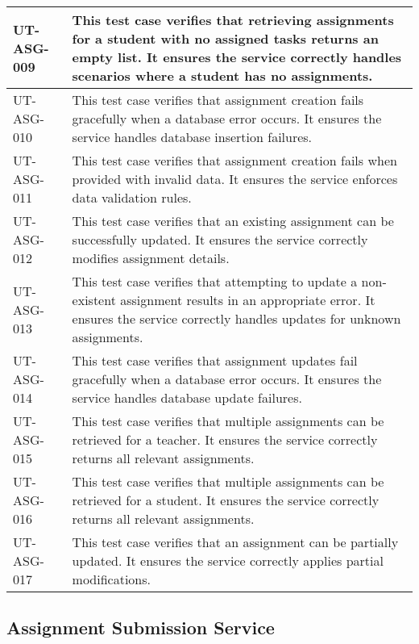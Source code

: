 \begin{longtable}{|p{}|p{}|}
\hline
UT-ASG-009 & This test case verifies that retrieving assignments for a student with no assigned tasks returns an empty list. It ensures the service correctly handles scenarios where a student has no assignments. \\
\hline
UT-ASG-010 & This test case verifies that assignment creation fails gracefully when a database error occurs. It ensures the service handles database insertion failures. \\
\hline
UT-ASG-011 & This test case verifies that assignment creation fails when provided with invalid data. It ensures the service enforces data validation rules. \\
\hline
UT-ASG-012 & This test case verifies that an existing assignment can be successfully updated. It ensures the service correctly modifies assignment details. \\
\hline
UT-ASG-013 & This test case verifies that attempting to update a non-existent assignment results in an appropriate error. It ensures the service correctly handles updates for unknown assignments. \\
\hline
UT-ASG-014 & This test case verifies that assignment updates fail gracefully when a database error occurs. It ensures the service handles database update failures. \\
\hline
UT-ASG-015 & This test case verifies that multiple assignments can be retrieved for a teacher. It ensures the service correctly returns all relevant assignments. \\
\hline
UT-ASG-016 & This test case verifies that multiple assignments can be retrieved for a student. It ensures the service correctly returns all relevant assignments. \\
\hline
UT-ASG-017 & This test case verifies that an assignment can be partially updated. It ensures the service correctly applies partial modifications. \\
\hline
\end{longtable}

\subsection{Assignment Submission Service}

